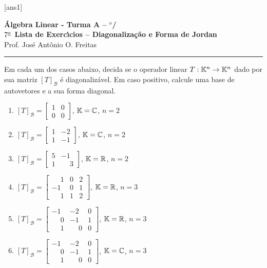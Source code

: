 \documentclass[12pt]{exam}
\begin{document}
[ans1]
\begin{center}
{\Large\bf \'Algebra Linear - Turma A -- \semestre$^{o}$/\ano} \\ \vspace{9pt} {\large\bf
  $7^{\underline{a}}$ Lista de Exerc{\'\i}cios -- Diagonaliza\c{c}\~ao e Forma de Jordan}\\ \vspace{9pt} Prof. Jos{\'e} Ant{\^o}nio O. Freitas
\end{center}
\hrule


\begin{exercicio}
  Em cada um dos casos abaixo, decida se o operador linear $T : \mathbb{K}^n \to \mathbb{K}^n$ dado por sua matriz $[T]_\mathcal{B}$ \'e diagonaliz\'avel. Em caso positivo, calcule uma base de autovetores e a sua forma diagonal.
  \begin{enumerate}[label=({\alph*})]
    \item $[T]_\mathcal{B} = \begin{bmatrix} 1 & 0\\ 0 & 0\end{bmatrix}$, $\mathbb{K} = \mathbb{C}$, $n = 2$
    \item $[T]_\mathcal{B} = \begin{bmatrix} 1 & -2\\ 1 & -1\end{bmatrix}$, $\mathbb{K} = \mathbb{C}$, $n = 2$
    \item $[T]_\mathcal{B} = \begin{bmatrix} 5 & -1\\ 1 & \phantom{-} 3\end{bmatrix}$, $\mathbb{K} = \mathbb{R}$, $n = 2$
    \item $[T]_\mathcal{B} = \begin{bmatrix} \phantom{-} 1 & 0 & 2\\ -1 & 0 & 1\\ \phantom{-} 1 & 1 & 2\end{bmatrix}$, $\mathbb{K} = \mathbb{R}$, $n = 3$
    \item $[T]_\mathcal{B} = \begin{bmatrix} -1 & -2 & 0\\ \phantom{-} 0 & -1 & 1\\ \phantom{-} 1 & \phantom{-} 0 & 0\end{bmatrix}$, $\mathbb{K} = \mathbb{R}$, $n = 3$
    \item $[T]_\mathcal{B} = \begin{bmatrix} -1 & -2 & 0\\ \phantom{-} 0 & -1 & 1\\ \phantom{-} 1 & \phantom{-} 0 & 0\end{bmatrix}$, $\mathbb{K} = \mathbb{C}$, $n = 3$

\end{enumerate}
\end{exercicio}
\end{document}
